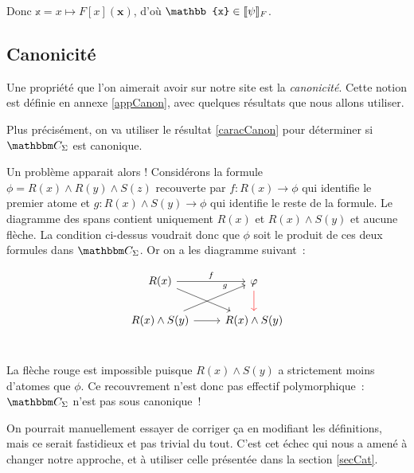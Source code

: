 \begin{pv}
    Donc $\mathbb{x} = x\mapsto F[x](\mathbf{x})$, d'où $\mathbb{x}\in\sem{\psi}_F$.
\end{pv}

\subsection{Canonicité}

Une propriété que l'on aimerait avoir sur notre site est la \emph{canonicité}. Cette
notion est définie en annexe \ref{appCanon}, avec quelques résultats que nous allons
utiliser.

Plus précisément, on va utiliser le résultat \ref{caracCanon} pour déterminer si
$\C_\Sigma$ est canonique.

Un problème apparait alors ! Considérons la formule $\phi=R(x)\wedge R(y)\wedge S(z)$
recouverte par $f:R(x)\rightarrow\phi$ qui identifie le premier atome et
$g:R(x)\wedge S(y)\rightarrow\phi$ qui identifie le reste de la formule. Le diagramme
des spans contient uniquement $R(x)$ et $R(x)\wedge S(y)$ et aucune flèche. La
condition ci-dessus voudrait donc que $\phi$ soit le produit de ces deux formules dans
$\C_\Sigma$. Or on a les diagramme suivant~:

\[\begin{tikzcd}
    R(x) \arrow[r, "f"] \arrow[rd] & \phi \arrow[d, red] \\
    R(x)\wedge S(y) \arrow[ru, near end, "g"] \arrow[r] & R(x)\wedge S(y) \\
\end{tikzcd}\]

La flèche rouge est impossible puisque $R(x)\wedge S(y)$ a strictement moins d'atomes
que $\phi$. Ce recouvrement n'est donc pas effectif polymorphique~: $\C_\Sigma$ n'est pas
sous canonique~!

On pourrait manuellement essayer de corriger ça en modifiant les définitions, mais ce
serait fastidieux et pas trivial du tout. C'est cet échec qui nous a amené à changer
notre approche, et à utiliser celle présentée dans la section \ref{secCat}.

